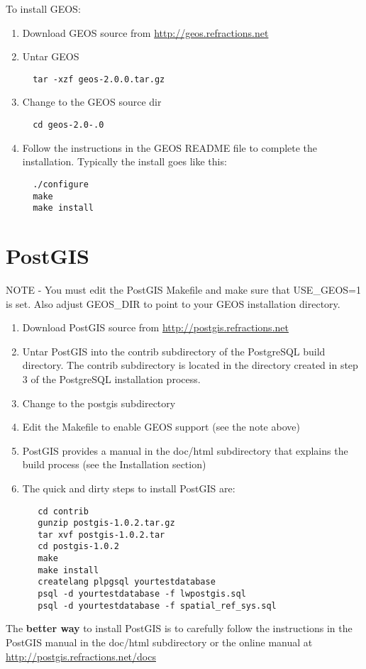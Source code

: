   To install GEOS:
  \begin{enumerate}
  \item Download GEOS source from \url{http://geos.refractions.net}
  \item Untar GEOS
  \begin{verbatim}
  tar -xzf geos-2.0.0.tar.gz
  \end{verbatim}
  \item Change to the GEOS source dir
  \begin{verbatim}
  cd geos-2.0-.0
  \end{verbatim}
  \item Follow the instructions in the GEOS README file to complete the installation. Typically the install goes like this:
  \begin{verbatim}
  ./configure
  make
  make install
  \end{verbatim}

  \end{enumerate}

  \section{PostGIS}

  NOTE - You must edit the PostGIS Makefile and make sure that USE\_GEOS=1 is
  set. Also adjust GEOS\_DIR to point to your GEOS installation directory.
  \begin{enumerate}
  \item Download PostGIS source from \url{http://postgis.refractions.net} 

  \item Untar PostGIS into the contrib subdirectory of the PostgreSQL build directory. The contrib subdirectory is located in the directory created in step 3 of the PostgreSQL installation process.
  \item Change to the postgis subdirectory
  \item Edit the Makefile to enable GEOS support (see the note above)
\item PostGIS provides a manual in the doc/html subdirectory that explains the build process (see the Installation section)
  \item The quick and dirty steps to install PostGIS are:
  \begin{verbatim}
   cd contrib
   gunzip postgis-1.0.2.tar.gz 
   tar xvf postgis-1.0.2.tar 
   cd postgis-1.0.2 
   make 
   make install 
   createlang plpgsql yourtestdatabase 
   psql -d yourtestdatabase -f lwpostgis.sql 
   psql -d yourtestdatabase -f spatial_ref_sys.sql 
  \end{verbatim}
  \end{enumerate}
The \textbf{better way} to install PostGIS is to carefully follow the instructions in the PostGIS manual in the doc/html subdirectory or the online manual at \url{http://postgis.refractions.net/docs}

